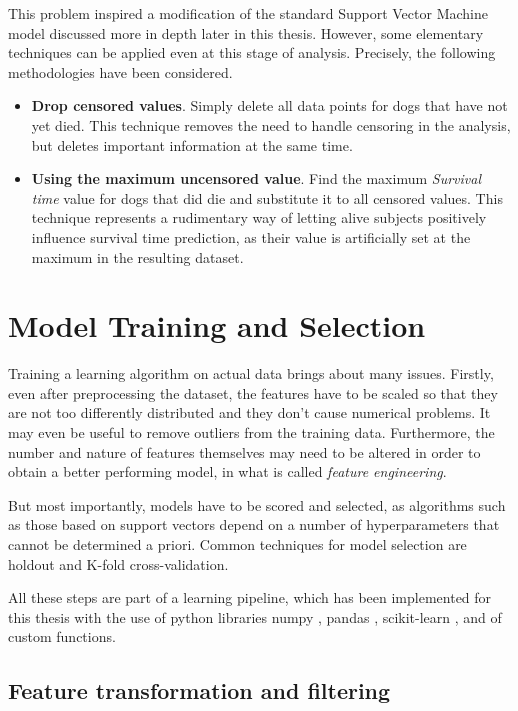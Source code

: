\documentclass[12pt]{report}
\begin{document}
This problem inspired a modification of the standard Support Vector Machine model discussed more in depth later in this thesis. However, some elementary techniques can be applied even at this stage of analysis. Precisely, the following methodologies have been considered.
\begin{itemize}
\item \textbf{Drop censored values}. Simply delete all data points for dogs that have not yet died. This technique removes the need to handle censoring in the analysis, but deletes important information at the same time.
\item \textbf{Using the maximum uncensored value}. Find the maximum \textit{Survival time} value for dogs that did die and substitute it to all censored values. This technique represents a rudimentary way of letting alive subjects positively influence survival time prediction, as their value is artificially set at the maximum in the resulting dataset.
\end{itemize}

\chapter{Model Training and Selection}
\label{chmodsel}
Training a learning algorithm on actual data brings about many issues.
Firstly, even after preprocessing the dataset, the features have to be scaled so that they are not too differently distributed and they don't cause numerical problems. It may even be useful to remove outliers from the training data. Furthermore, the number and nature of features themselves may need to be altered in order to obtain a better performing model, in what is called \textit{feature engineering}.

But most importantly, models have to be scored and selected, as algorithms such as those based on support vectors depend on a number of hyperparameters that cannot be determined a priori. Common techniques for model selection are holdout and K-fold cross-validation.

All these steps are part of a learning pipeline, which has been implemented for this thesis with the use of python libraries numpy \cite{numpy}, pandas \cite{pandas}, scikit-learn \cite{sklearn}, and of custom functions.

\section{Feature transformation and filtering}
\end{document}
